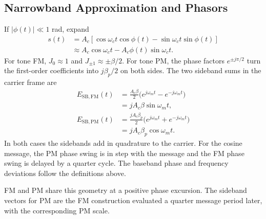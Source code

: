\documentclass[12pt,a4paper]{article}
\begin{document}
\subsection{Narrowband Approximation and Phasors}
If $|\phi(t)|\ll1$ rad, expand
\[
\begin{aligned}
 s(t)&=A_c[\cos\omega_ct\cos\phi(t)-\sin\omega_ct\sin\phi(t)]\\
     &\approx A_c\cos\omega_ct-A_c\phi(t)\sin\omega_ct.
\end{aligned}
\]
For tone FM, $J_0\approx1$ and $J_{\pm1}\approx\pm\beta/2$. For tone PM, the phase factors $e^{\pm j\pi/2}$ turn the first-order coefficients into $j\beta_p/2$ on both sides. The two sideband sums in the carrier frame are
\[
\begin{aligned}
 E_{\mathrm{SB,FM}}(t)
 &= \frac{A_c\beta}{2}\bigl(e^{j\omega_mt}-e^{-j\omega_mt}\bigr)\\
 &= jA_c\beta\sin\omega_mt,\\[3pt]
 E_{\mathrm{SB,PM}}(t)
 &= \frac{jA_c\beta_p}{2}\bigl(e^{j\omega_mt}+e^{-j\omega_mt}\bigr)\\
 &= jA_c\beta_p\cos\omega_mt.
\end{aligned}
\]
In both cases the sidebands add in quadrature to the carrier. For the cosine message, the PM phase swing is in step with the message and the FM phase swing is delayed by a quarter cycle. The baseband phase and frequency deviations follow the definitions above.

\begin{tcolorbox}[tikzbox, unbreakable, title={Narrowband FM and PM Phasor Construction}]
\centering
{}\par
\small FM and PM share this geometry at a positive phase excursion. The sideband vectors for PM are the FM construction evaluated a quarter message period later, with the corresponding PM scale.
\end{tcolorbox}
\end{document}
